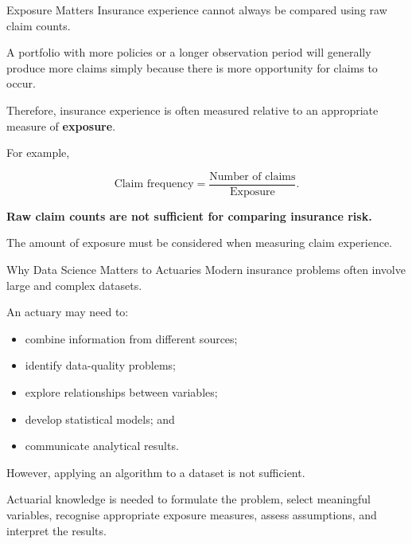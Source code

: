 \documentclass[
  ignorenonframetext,
  aspectratio=169,
]{beamer}
\providecommand{\tightlist}{%
  \setlength{\itemsep}{0pt}\setlength{\parskip}{0pt}}
\begin{document}
\begin{frame}{Exposure Matters}
\protect{}\label{exposure-matters}
Insurance experience cannot always be compared using raw claim counts.

A portfolio with more policies or a longer observation period will
generally produce more claims simply because there is more opportunity
for claims to occur.

Therefore, insurance experience is often measured relative to an
appropriate measure of \textbf{exposure}.

For example,

\[
\text{Claim frequency}
=
\frac{\text{Number of claims}}
{\text{Exposure}}.
\]

\begin{tcolorbox}[enhanced jigsaw, arc=.35mm, bottomrule=.15mm, bottomtitle=1mm, breakable, colback=white, colbacktitle=quarto-callout-important-color!10!white, colframe=quarto-callout-important-color-frame, coltitle=black, left=2mm, leftrule=.75mm, opacityback=0, opacitybacktitle=0.6, rightrule=.15mm, title=\textcolor{quarto-callout-important-color}{\faExclamation}\hspace{0.5em}{Key idea}, titlerule=0mm, toprule=.15mm, toptitle=1mm]

\textbf{Raw claim counts are not sufficient for comparing insurance
risk.}

The amount of exposure must be considered when measuring claim
experience.

\end{tcolorbox}
\end{frame}

\begin{frame}{Why Data Science Matters to Actuaries}
\protect{}\label{why-data-science-matters-to-actuaries}
Modern insurance problems often involve large and complex datasets.

An actuary may need to:

\begin{itemize}
\tightlist
\item
  combine information from different sources;
\item
  identify data-quality problems;
\item
  explore relationships between variables;
\item
  develop statistical models; and
\item
  communicate analytical results.
\end{itemize}

However, applying an algorithm to a dataset is not sufficient.

Actuarial knowledge is needed to formulate the problem, select
meaningful variables, recognise appropriate exposure measures, assess
assumptions, and interpret the results.
\end{frame}
\end{document}
